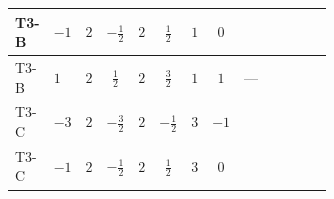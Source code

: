 \documentclass[8pt]{article}
\begin{document}
\begin{landscape}
\begin{longtable}{@{}llcccccc >{\raggedright\arraybackslash}p{0.21\linewidth} >{\raggedright\arraybackslash}p{0.21\linewidth} >{\raggedright\arraybackslash}p{0.21\linewidth}@{}}
\midrule
T3-B & $-1$ & $2$ & $-\frac{1}{2}$ & $2$ & $\frac{1}{2}$ & $1$ & $0$ & \scriptsize\adjustbox{max width=\linewidth}{$\begin{gathered} +{g_1}^2 \left(-6 {g_2}^2-3 {\lambda_{HS_1}^{(A)}}\right)\end{gathered}$} & \scriptsize\adjustbox{max width=\linewidth}{$\begin{gathered} -9 {g_2}^2 {\lambda_{HS_1}^{(A)}}\end{gathered}$} & \scriptsize\adjustbox{max width=\linewidth}{$\begin{gathered} +{\lambda_{12}^{(A)}} {\lambda_{HS_2}^{(A)}}\end{gathered}$} \\
\midrule
T3-B & $1$ & $2$ & $\frac{1}{2}$ & $2$ & $\frac{3}{2}$ & $1$ & $1$ & --- & \scriptsize\adjustbox{max width=\linewidth}{$\begin{gathered} -9 {g_2}^2 {\lambda_{HS_1}^{(A)}}\end{gathered}$} & \scriptsize\adjustbox{max width=\linewidth}{$\begin{gathered} +{\lambda_{12}^{(A)}} {\lambda_{HS_2}^{(A)}}\end{gathered}$} \\
\midrule
T3-C & $-3$ & $2$ & $-\frac{3}{2}$ & $2$ & $-\frac{1}{2}$ & $3$ & $-1$ & \scriptsize\adjustbox{max width=\linewidth}{$\begin{gathered} +{g_1}^2 \left(-18 {g_2}^2-15 {\lambda_{HS_1}^{(A)}}\right)\end{gathered}$} & \scriptsize\adjustbox{max width=\linewidth}{$\begin{gathered} -9 {g_2}^2 {\lambda_{HS_1}^{(A)}}\end{gathered}$} & \scriptsize\adjustbox{max width=\linewidth}{$\begin{gathered} +{\lambda_{12}^{(A)}} {\lambda_{HS_2}^{(A)}}\end{gathered}$} \\
\midrule
T3-C & $-1$ & $2$ & $-\frac{1}{2}$ & $2$ & $\frac{1}{2}$ & $3$ & $0$ & \scriptsize\adjustbox{max width=\linewidth}{$\begin{gathered} +{g_1}^2 \left(-6 {g_2}^2-3 {\lambda_{HS_1}^{(A)}}\right)\end{gathered}$} & \scriptsize\adjustbox{max width=\linewidth}{$\begin{gathered} -9 {g_2}^2 {\lambda_{HS_1}^{(A)}}\end{gathered}$} & \scriptsize\adjustbox{max width=\linewidth}{$\begin{gathered} +{\lambda_{12}^{(A)}} {\lambda_{HS_2}^{(A)}}\end{gathered}$} \\

\end{longtable}
\end{landscape}
\end{document}

